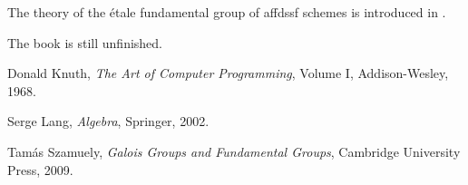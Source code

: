\documentclass[10pt,a5paper]{article}
\begin{document}
The theory of the étale fundamental group of affdssf \cite[Proposition~5]{szamuely} schemes is  introduced in \cite[Proposition~5]{szamuely}.

The book \cite{knuth68} is still unfinished.

\cite{knuth68, szamuely}

\begin{thebibliography}{999}
		Donald Knuth,
		\emph{The Art of Computer Programming},
		Volume I, Addison-Wesley, 1968.
	
		Serge Lang,
		\emph{Algebra},
		Springer,
		2002.

		Tamás Szamuely,
		\emph{Galois Groups and Fundamental Groups},
		Cambridge University Press,
		2009.
\end{thebibliography}
\end{document}
